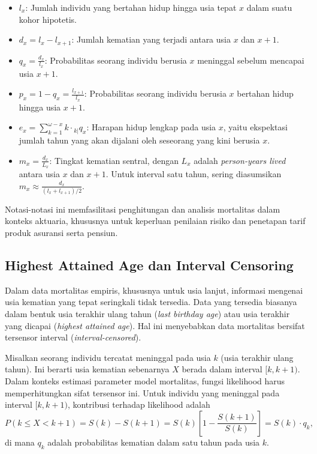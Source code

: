 \begin{itemize}
    \item $l_x$: Jumlah individu yang bertahan hidup hingga usia tepat $x$ dalam suatu kohor hipotetis.
    \item $d_x = l_x - l_{x+1}$: Jumlah kematian yang terjadi antara usia $x$ dan $x+1$.
    \item $q_x = \frac{d_x}{l_x}$: Probabilitas seorang individu berusia $x$ meninggal sebelum mencapai usia $x+1$.
    \item $p_x = 1 - q_x = \frac{l_{x+1}}{l_x}$: Probabilitas seorang individu berusia $x$ bertahan hidup hingga usia $x+1$.
    \item $e_x = \sum_{k=1}^{\omega - x} k \cdot {}_{k|} q_x$: Harapan hidup lengkap pada usia $x$, yaitu ekspektasi jumlah tahun yang akan dijalani oleh seseorang yang kini berusia $x$.
    \item $m_x = \frac{d_x}{L_x}$: Tingkat kematian sentral, dengan $L_x$ adalah \textit{person-years lived} antara usia $x$ dan $x+1$. Untuk interval satu tahun, sering diasumsikan $m_x \approx \frac{d_x}{(l_x + l_{x+1})/2}$.
\end{itemize}

Notasi-notasi ini memfasilitasi penghitungan dan analisis mortalitas dalam konteks aktuaria, khususnya untuk keperluan penilaian risiko dan penetapan tarif produk asuransi serta pensiun.

\subsection{Highest Attained Age dan Interval Censoring}

Dalam data mortalitas empiris, khususnya untuk usia lanjut, informasi mengenai usia kematian yang tepat seringkali tidak tersedia. Data yang tersedia biasanya dalam bentuk usia terakhir ulang tahun (\textit{last birthday age}) atau usia terakhir yang dicapai (\textit{highest attained age}). Hal ini menyebabkan data mortalitas bersifat tersensor interval (\textit{interval-censored}).

Misalkan seorang individu tercatat meninggal pada usia $k$ (usia terakhir ulang tahun). Ini berarti usia kematian sebenarnya $X$ berada dalam interval $[k, k+1)$. Dalam konteks estimasi parameter model mortalitas, fungsi likelihood harus memperhitungkan sifat tersensor ini. Untuk individu yang meninggal pada interval $[k, k+1)$, kontribusi terhadap likelihood adalah
\begin{equation}
    P(k \leq X < k+1) = S(k) - S(k+1) = S(k) \left[1 - \frac{S(k+1)}{S(k)}\right] = S(k) \cdot q_k,
\end{equation}
di mana $q_k$ adalah probabilitas kematian dalam satu tahun pada usia $k$.

